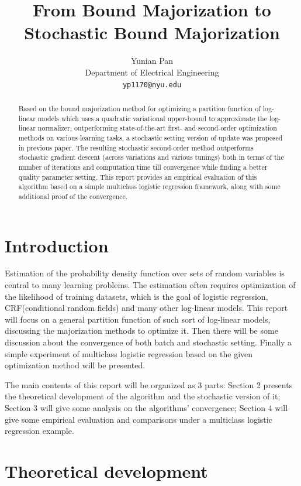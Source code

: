 \documentclass{article}
\title{From Bound Majorization to Stochastic Bound Majorization}
\author{%
  Yunian Pan \\
  Department of Electrical Engineering \\ 
  \texttt{yp1170@nyu.edu} 
}
\begin{document}
\maketitle

\begin{abstract}
  Based on the bound majorization method for optimizing a partition function of log-linear models which uses a quadratic variational upper-bound to approximate the
  log-linear normalizer, outperforming state-of-the-art first- and second-order
  optimization methods on various learning tasks, a stochastic setting version of update was proposed in previous paper. The resulting stochastic second-order method
  outperforms stochastic gradient descent (across variations and various tunings) both in terms of the number of iterations and computation time till convergence
  while finding a better quality parameter setting. This report provides an empirical evaluation of this algorithm based on a simple multiclass logistic regression framework, 
  along with some additional proof of the convergence. 
\end{abstract}

\section{Introduction}

Estimation of the probability density function over sets of random variables is central to many learning problems. The estimation often requires optimization of the likelihood
of training datasets, which is the goal of logistic regression, CRF(conditional random fields) and many other log-linear models. This report will focus on a general
 partition function of such sort of log-linear models, discussing the majorization methods to optimize it. Then there will be some discussion about the convergence of both 
batch and stochastic setting. Finally a simple experiment of multiclass logistic regression based on the given optimization method will be presented.

 The main contents of this report will be organized as 3 parts:
 Section 2 presents the theoretical development of the algorithm and the stochastic version of it; Section 3 will give some analysis on the algorithms' convergence; Section 4
will give some empirical evaluation and comparisons under a multiclass logistic regression example.


\section{Theoretical development}
\end{document}
